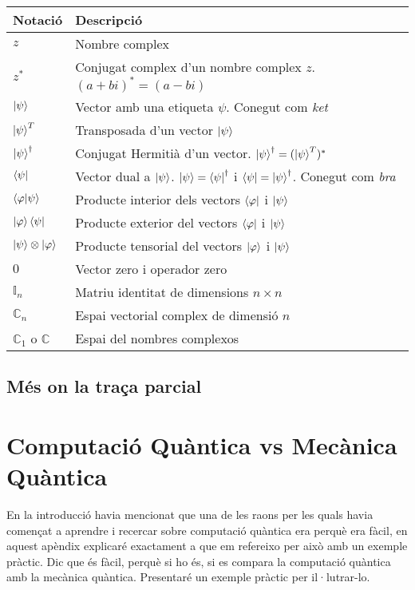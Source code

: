 \begin{tabular}{ p{2cm}|p{12cm} }
	\hline
	Notació & Descripció\\
	\hline
	\hline
	$z$ & Nombre complex    \\
	$z^{*}$ & Conjugat complex d'un nombre complex $z$. $(a+ bi)^{*} = (a -bi)$\\
	$\ket{\psi} $ & Vector amb una etiqueta $\psi$. Conegut com \textit{ket}\\
	$\ket{\psi}^T$ & Transposada d'un vector $\ket{\psi}$ \\
	$\ket{\psi}^\dag $ &  Conjugat Hermitià d'un vector. $\ket{\psi}^\dag = (\ket{\psi}^T)^* $\\
	$\bra{\psi} $ & Vector dual a $\ket{\psi}$. $ \ket{\psi} = \bra{\psi}^{\dag}$ i $\bra{\psi} = \ket{\psi}^\dag$. Conegut com \textit{bra}\\
	$ \bra{\varphi}\ket{\psi} $ & Producte interior dels vectors $\bra{\varphi}$ i $\ket{\psi}$ \\
	$ \ket{\varphi}\bra{\psi} $ & Producte exterior del vectors $\bra{\varphi}$ i $\ket{\psi}$ \\
	$ \ket{\psi}\otimes\ket{\varphi}$ & Producte tensorial del vectors $\ket{\varphi}$ i $\ket{\psi}$ \\
	$ 0 $ & Vector zero i operador zero \\
	$ \mathbb{I}_n $ & Matriu identitat de dimensions $n\times n$ \\
	$ \mathbb{C}_n $ & Espai vectorial complex de dimensió $n$ \\
	$ \mathbb{C}_1$ o $\mathbb{C} $ & Espai del nombres complexos \\
	
\end{tabular}
\section{Més on la traça parcial}



\chapter{Computació Quàntica vs Mecànica Quàntica}
En la introducció havia mencionat que una de les raons per les quals havia començat a aprendre i recercar sobre computació quàntica era perquè era fàcil, en aquest apèndix explicaré exactament a que em refereixo per això amb un exemple pràctic. Dic que és fàcil, perquè si ho és, si es compara la computació quàntica amb la mecànica quàntica. Presentaré un exemple pràctic per il·lutrar-lo.  

